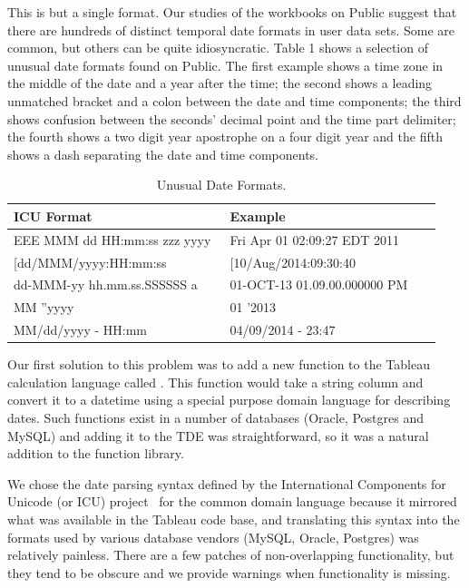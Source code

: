 This is but a single format. Our studies of the workbooks on Public suggest that there are hundreds of distinct temporal date formats in user data sets. Some are common, but others can be quite idiosyncratic. Table 1 shows a selection of unusual date formats found on Public. The first example shows a time zone in the middle of the date and a year after the time; the second shows a leading unmatched bracket and a colon between the date and time components; the third shows confusion between the seconds' decimal point and the time part delimiter; the fourth shows a two digit year apostrophe on a four digit year and the fifth shows a dash separating the date and time components.



\begin{table}[ht]
\centering
\begin{tabular}{|p{0.498\linewidth}| p{0.485\linewidth}|}
\hline
\centering
\textbf{ICU Format} & \textbf{Example}\\ \hline
\scriptsize{EEE MMM dd HH:mm:ss zzz yyyy} & \scriptsize{Fri Apr 01 02:09:27 EDT 2011}\\ \hline
\scriptsize{[dd/MMM/yyyy:HH:mm:ss} & \scriptsize{[10/Aug/2014:09:30:40}\\ \hline
\scriptsize{dd-MMM-yy hh.mm.ss.SSSSSS a} & \scriptsize{01-OCT-13 01.09.00.000000 PM}\\ \hline
\scriptsize{MM ''yyyy} & \scriptsize{01 '2013}\\ \hline
\scriptsize{MM/dd/yyyy - HH:mm} & \scriptsize{04/09/2014 - 23:47}\\ \hline
\end{tabular}
\label{tab:dateformats}
\caption{Unusual Date Formats.}
\end{table}


Our first solution to this problem was to add a new function to the Tableau calculation language called \dateparse. This function would take a string column and convert it to a datetime using a special purpose domain language for describing dates. Such functions exist in a number of databases (\eg Oracle, Postgres and MySQL) and adding it to the TDE was straightforward, so it was a natural addition to the function library.

We chose the date parsing syntax defined by the International Components for Unicode (or ICU) project~\cite{ICU} for the common domain language because it mirrored what was available in the Tableau code base, and translating this syntax into the formats used by various database vendors (\eg MySQL, Oracle, Postgres) was relatively painless. There are a few patches of non-overlapping functionality, but they tend to be obscure and we provide warnings when functionality is missing.

